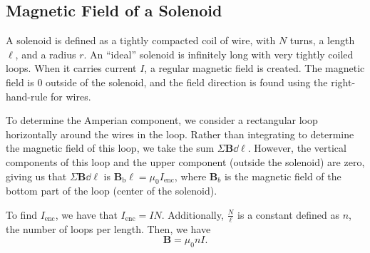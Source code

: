 \documentclass[11pt]{article}
\begin{document}
\subsection{Magnetic Field of a Solenoid}
A solenoid is defined as a tightly compacted coil of wire, with $N$ turns, a length $\ell$, and a radius $r$. An ``ideal'' solenoid is infinitely long with very tightly coiled loops. When it carries current $I$, a regular magnetic field is created. The magnetic field is 0 outside of the solenoid, and the field direction is found using the right-hand-rule for wires.

To determine the Amperian component, we consider a rectangular loop horizontally around the wires in the loop. Rather than integrating to determine the magnetic field of this loop, we take the sum $\Sigma \mathbf{B} \dd \ell$. However, the vertical components of this loop and the upper component (outside the solenoid) are zero, giving us that $\Sigma \mathbf{B} \dd \ell$ is $\mathbf{B}_{\mathrm{b}}\ell = \mu_0 I_{\mathrm{enc}}$, where $\mathbf{B}_b$ is the magnetic field of the bottom part of the loop (center of the solenoid).

To find $I_{\mathrm{enc}}$, we have that $I_{\mathrm{enc}} = IN$. Additionally, $\frac{N}{\ell}$ is a constant defined as $n$, the number of loops per length. Then, we have
\begin{equation}
    \mathbf{B} = \mu_0 n I.
\end{equation}
\end{document}

